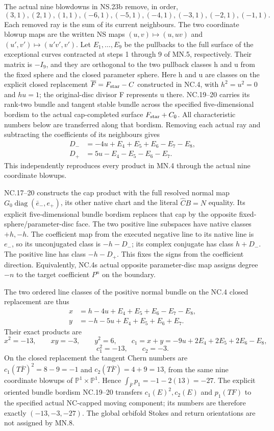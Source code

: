 The actual nine blowdowns in NS.23b remove, in order,
\[
 (3,1),(2,1),(1,1),(-6,1),(-5,1),(-4,1),(-3,1),(-2,1),(-1,1).
 \tag{MN.5}
\]
Each removed ray is the sum of its current neighbours. The two
coordinate blowup maps are the written NS maps \((u,v)\mapsto(u,uv)\)
and \((u',v')\mapsto(u'v',v')\). Let \(E_1,\ldots,E_9\) be
the pullbacks to the full surface of the exceptional curves contracted
at steps 1 through 9 of MN.5, respectively. Their matrix is \(-I_9\), and they are
orthogonal to the two pullback classes h and u from the fixed sphere
and the closed parameter sphere. Here h and u are classes on the explicit closed replacement
\(\overline F=F_{\rm star}-C\) constructed in NC.4, with
\(h^2=u^2=0\) and \(hu=1\); the original-disc divisor F
represents u there. NC.19--20 carries its rank-two bundle and tangent
stable bundle across the specified five-dimensional bordism to the
actual cap-completed surface \(F_{\rm star}+C_0\). All characteristic
numbers below are transferred along that bordism. Removing each actual ray and
subtracting the coefficients of its neighbours gives
\[
 \begin{aligned}
 D_-&=-4u+E_4+E_5+E_6-E_7-E_8,\\
 D_+&= 5u-E_4-E_5-E_6-E_7.
 \end{aligned}\tag{MN.6}
\]
This independently reproduces every product in MN.4 through the
actual nine coordinate blowups.

NC.17--20 constructs the cap product with the full resolved normal
map \(G_0\operatorname{diag}(\bar e_-,e_+)\), its other native
chart and the literal \(\widehat C B=N\) equality. Its explicit
five-dimensional bundle bordism replaces that cap by the opposite
fixed-sphere/parameter-disc face. The two positive line subspaces
have native classes \(+h,-h\). The coefficient map from the
executed negative line to its native line is \(e_-\), so its
unconjugated class is \(-h-D_-\); its complex conjugate has
class \(h+D_-\). The positive line has class \(-h-D_+\).
This fixes the signs from the coefficient direction. Equivalently,
NC.4\textquotesingle s actual opposite parameter-disc map assigns degree \(-n\)
to the target coefficient \(P^n\) on the boundary.

The two ordered line classes of the positive normal bundle on the
NC.4 closed replacement are thus
\[
 \begin{aligned}
 x&=h-4u+E_4+E_5+E_6-E_7-E_8,\\
 y&=-h-5u+E_4+E_5+E_6+E_7.
 \end{aligned}\tag{MN.7}
\]
Their exact products are
\[
 x^2=-13,\qquad xy=-3,\qquad y^2=6,
 \qquad c_1=x+y=-9u+2E_4+2E_5+2E_6-E_8,
\]
\[
                 c_1^2=-13,\qquad c_2=-3.
 \tag{MN.8}
\]
On the closed replacement the tangent Chern numbers are
\(c_1(T\overline F)^2=8-9=-1\) and
\(c_2(T\overline F)=4+9=13\), from the same nine coordinate
blowups of \(\mathbb P^1\times\mathbb P^1\). Hence
\(\int_{\overline F}p_1=-1-2(13)=-27\). The explicit oriented
bundle bordism NC.19--20 transfers \(c_1(E)^2,c_2(E)\) and
\(p_1(TF)\) to the specified actual NC-capped moving component;
its numbers are therefore exactly \((-13,-3,-27)\). The global orbifold
Stokes and return orientations are not assigned by MN.8.

